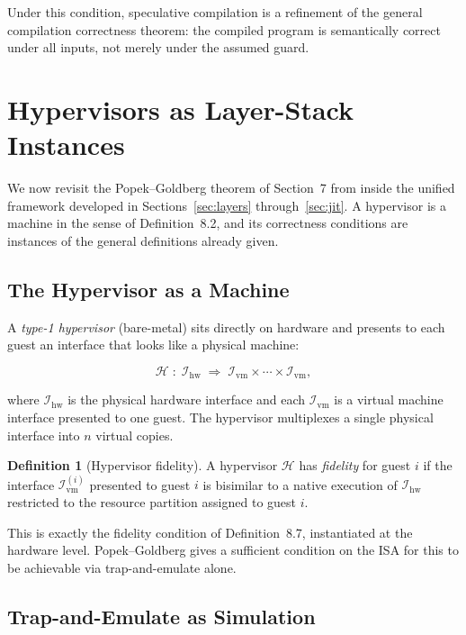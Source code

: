 \documentclass[11pt, a4paper]{article}
\theoremstyle{definition}
\newtheorem{definition}{Definition}[section]
\theoremstyle{plain}
\theoremstyle{remark}
\begin{document}
Under this condition, speculative compilation is a refinement of the general
compilation correctness theorem: the compiled program is semantically
correct under all inputs, not merely under the assumed guard.


\section{Hypervisors as Layer-Stack Instances}
\label{sec:hypervisors}

We now revisit the Popek--Goldberg theorem of Section~7 from inside the
unified framework developed in Sections~\ref{sec:layers}
through~\ref{sec:jit}. A hypervisor is a machine in the sense of
Definition~8.2, and its correctness conditions are instances of the general
definitions already given.

\subsection{The Hypervisor as a Machine}

A \emph{type-1 hypervisor} (bare-metal) sits directly on hardware and
presents to each guest an interface that looks like a physical machine:

\[
  \mathcal{H} \;:\; \mathcal{I}_{\mathrm{hw}} \;\Rightarrow\;
  \mathcal{I}_{\mathrm{vm}} \times \cdots \times \mathcal{I}_{\mathrm{vm}},
\]

where $\mathcal{I}_{\mathrm{hw}}$ is the physical hardware interface and
each $\mathcal{I}_{\mathrm{vm}}$ is a virtual machine interface presented
to one guest. The hypervisor multiplexes a single physical interface into
$n$ virtual copies.

\begin{definition}[Hypervisor fidelity]
  A hypervisor $\mathcal{H}$ has \emph{fidelity} for guest $i$ if the
  interface $\mathcal{I}_{\mathrm{vm}}^{(i)}$ presented to guest $i$ is
  bisimilar to a native execution of $\mathcal{I}_{\mathrm{hw}}$ restricted
  to the resource partition assigned to guest $i$.
\end{definition}

This is exactly the fidelity condition of Definition~8.7, instantiated at
the hardware level. Popek--Goldberg gives a sufficient condition on the ISA
for this to be achievable via trap-and-emulate alone.

\subsection{Trap-and-Emulate as Simulation}
\end{document}
